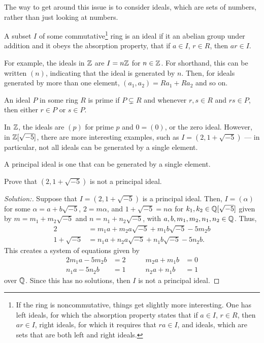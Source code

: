 The way to get around this issue is to consider ideals, which are sets of numbers, rather than just looking at numbers.
\begin{defn}
A subset $I$ of some commutative\footnote{If the ring is noncommutative, things get slightly more interesting. One has left ideals, for which the absorption property states that if $a\in I$, $r\in R$, then $ar\in I$, right ideals, for which it requires that $ra\in I$, and ideals, which are sets that are both left and right ideals.} ring is an ideal if it an abelian group under addition and it obeys the absorption property, that if $a\in I$, $r\in R$, then $ar\in I$.
\end{defn}
For example, the ideals in $\mathbb{Z}$ are $I = n\mathbb{Z}$ for $n\in\mathbb{Z}$. For shorthand, this can be written $(n)$, indicating that the ideal is generated by $n$. Then, for ideals generated by more than one element, $(a_1,a_2) = Ra_1 + Ra_2$ and so on.
\begin{defn}
An ideal $P$ in some ring $R$ is prime if $P \subsetneq R$ and whenever $r,s\in R$ and $rs\in P$, then either $r\in P$ or $s\in P$.
\end{defn}
In $\mathbb{Z}$, the ideals are $(p)$ for prime $p$ and $0 = (0)$, or the zero ideal. However, in $\mathbb{Z}[\sqrt{-5}]$, there are more interesting examples, such as $I = (2,1+\sqrt{-5})$ --- in particular, not all ideals can be generated by a single element.
\begin{defn}
A principal ideal is one that can be generated by a single element.
\end{defn}
\begin{ex}
Prove that $(2,1+\sqrt{-5})$ is not a principal ideal.
\end{ex}
\begin{proof}[Solution:]
Suppose that $I = (2,1+\sqrt{-5})$ is a principal ideal. Then, $I = (\alpha)$ for some $\alpha = a + b\sqrt{-5}$, $2 = m\alpha$, and $1+\sqrt{-5} = n\alpha$ for $k_1,k_2\in\mathbb{Q}[\sqrt{-5}]$ given by $m = m_1 + m_2\sqrt{-5}$ and $n = n_1 +n_2\sqrt{-5}$, with $a,b,m_1,m_2,n_1,n_2\in\mathbb{Q}$. Thus,
\begin{align*}
2 &= m_1a + m_2a\sqrt{-5} + m_1b\sqrt{-5} -5m_2b\\
1+\sqrt{-5} &= n_1a + n_2a\sqrt{-5} +n_1b\sqrt{-5} -5n_2b.
\end{align*}
This creates a system of equations given by
\begin{alignat*}{2}
m_1a-5m_2b &= 2\qquad &m_2a +m_1b &=0\\
n_1a - 5n_2b &= 1 &n_2a +n_1b &=1
\end{alignat*}
over $\mathbb{Q}$. Since this has no solutions, then $I$ is not a principal ideal.
\end{proof}
